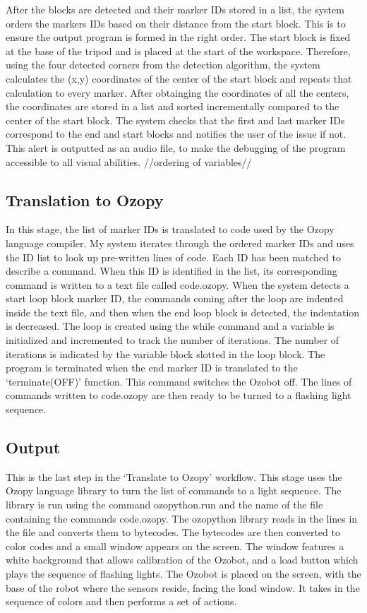 \documentclass[oneside,%
                    author={Malak Hajji},
                    degree={BSc},
                    title={Designing An Accessible Computational Toolkit For Students},
                  subtitle={With Mixed Visual Abilities}]{dissertation}
\begin{document}
After the blocks are detected and their marker IDs stored in a list, the system orders the markers IDs based on their distance from the start block. This is to ensure the output program is formed in the right order. The start block is fixed at the base of the tripod and is placed at the start of the workspace. Therefore, using the four detected corners from the detection algorithm, the system calculates the (x,y) coordinates of the center of the start block and repeats that calculation to every marker. After obtainging the coordinates of all the centers, the coordinates are stored in a list and sorted incrementally compared to the center of the start block. 
The system checks that the first and last marker IDs correspond to the end and start blocks and notifies the user of the issue if not. This alert is outputted as an audio file, to make the debugging of the program accessible to all visual abilities.  
//ordering of variables// 
 
\subsection{Translation to Ozopy}
 
In this stage, the list of marker IDs is translated to code used by the Ozopy language compiler. My system iterates through the ordered marker IDs and uses the ID list to look up pre-written lines of code. Each ID has been matched to describe a command. When this ID is identified in the list, its corresponding command is written to a text file called code.ozopy.  
When the system detects a start loop block marker ID, the commands coming after the loop are indented inside the text file, and then when the end loop block is detected, the indentation is decreased. The loop is created using the while command and a variable is initialized and incremented to track the number of iterations. The number of iterations is indicated by the variable block slotted in the loop block. The program is terminated when the end marker ID is translated to the ‘terminate(OFF)’ function. This command switches the Ozobot off. 
The lines of commands written to code.ozopy are then ready to be turned to a flashing light sequence. 
 
 
\subsection{Output}  
This is the last step in the ‘Translate to Ozopy’ workflow. This stage uses the Ozopy language library to turn the list of commands to a light sequence. The library is run using the command ozopython.run and the name of the file containing the commands code.ozopy. The ozopython library reads in the lines in the file and converts them to bytecodes. The bytecodes are then converted to color codes and a small window appears on the screen. The window features a white background that allows calibration of the Ozobot, and a load button which plays the sequence of flashing lights. The Ozobot is placed on the screen, with the base of the robot where the sensors reside, facing the load window. It takes in the sequence of colors and then performs a set of actions. 
\end{document}

